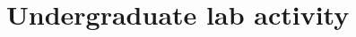\documentclass[../thesis.tex]{subfiles}
\begin{document}


\section{Undergraduate lab activity}
\end{document}
